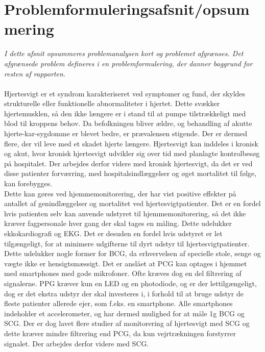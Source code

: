 \section{Problemformuleringsafsnit/opsummering}
\textit{I dette afsnit opsummeres problemanalysen kort og problemet afgrænses. Det afgrænsede problem defineres i en problemformulering, der danner baggrund for resten af rapporten.}\\
\\
Hjertesvigt er et syndrom karakteriseret ved symptomer og fund, der skyldes strukturelle eller funktionelle abnormaliteter i hjertet. Dette svækker hjertemusklen, så den ikke længere er i stand til at pumpe tilstrækkeligt med blod til kroppens behov.
Da befolkningen bliver ældre, og behandling af akutte hjerte-kar-sygdomme er blevet bedre, er prævalensen stigende. Der er dermed flere, der vil leve med et skadet hjerte længere. %
Hjertesvigt kan inddeles i kronisk og akut, hvor kronisk hjertesvigt udvikler sig over tid med planlagte kontrolbesøg på hospitalet. Der arbejdes derfor videre med kronisk hjertesvigt, da det er ved disse patienter forværring, med hospitalsindlæggelser og øget mortalitet til følge, kan forebygges.\\
Dette kan gøres ved hjemmemonitorering, der har vist positive effekter på antallet af genindlæggelser og mortalitet ved hjertesvigtpatienter. Det er en fordel hvis patienten selv kan anvende udstyret til hjemmemonitorering, så det ikke kræver fagpersonale hver gang der skal tages en måling. Dette udelukker ekkokardiografi og EKG. Det er desuden en fordel hvis udstyret er let tilgængeligt, for at minimere udgifterne til dyrt udstyr til hjertesvigtpatienter. Dette udelukker nogle former for BCG, da erhvervelsen af specielle stole, senge og vægte ikke er hensigtsmæssigt. Det er anslået at PCG kan optages i hjemmet med smartphones med gode mikrofoner. Ofte kræves dog en del filtrering af signalerne. PPG kræver kun en LED og en photodiode, og er der lettilgængeligt, dog er det ekstra udstyr der skal investeres i, i forhold til at bruge udstyr de fleste patienter allerede ejer, som f.eks. en smartphone. Alle smartphones indeholder et accelerometer, og har dermed mulighed for at måle 1g BCG og SCG. Der er dog lavet flere studier af monitorering af hjertesvigt med SCG og dette kræver mindre filtrering end PCG, da kun vejrtrækningen forstyrrer signalet. Der arbejdes derfor videre med SCG.

